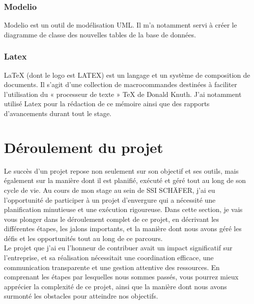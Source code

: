 \documentclass[a4paper, 12pt, french]{article}
\begin{document}
				\subsubsection{Modelio}%
					Modelio est un outil de modélisation UML. Il m'a notamment servi à créer le diagramme de classe des nouvelles tables de la base de données.

				\subsubsection{Latex}%
					LaTeX (dont le logo est LATEX) est un langage et un système de composition de documents. Il s'agit d'une collection de macrocommandes destinées à faciliter l'utilisation du « processeur de texte » TeX de Donald Knuth. J'ai notamment utilisé Latex pour la rédaction de ce mémoire ainsi que des rapports d'avancements durant tout le stage.			

		
		\newpage

		\section{Déroulement du projet}
			Le succès d'un projet repose non seulement sur son objectif et ses outils, mais également sur la manière dont il est planifié, exécuté et géré tout au long de son cycle de vie. Au cours de mon stage au sein de SSI SCHÄFER, j'ai eu l'opportunité de participer à un projet d'envergure qui a nécessité une planification minutieuse et une exécution rigoureuse. Dans cette section, je vais vous plonger dans le déroulement complet de ce projet, en décrivant les différentes étapes, les jalons importants, et la manière dont nous avons géré les défis et les opportunités tout au long de ce parcours.\\

			Le projet que j'ai eu l'honneur de contribuer avait un impact significatif sur l'entreprise, et sa réalisation nécessitait une coordination efficace, une communication transparente et une gestion attentive des ressources. En comprenant les étapes par lesquelles nous sommes passés, vous pourrez mieux apprécier la complexité de ce projet, ainsi que la manière dont nous avons surmonté les obstacles pour atteindre nos objectifs.\\
\end{document}
